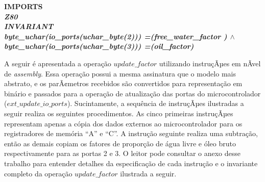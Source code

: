 \documentclass[11pt]{article} %
\begin{document}
\small{
\begin{sloppypar}
\hspace*{-0.30in}\bf IMPORTS\\
\hspace*{0.20in}\it Z80\\
\bf INVARIANT\\
\hspace*{0.20in}\it byte\_uchar\rm (\it io\_ports\rm (\it uchar\_byte\rm (\rm 2\rm )\rm )\rm ) \rm
=\hspace*{0.10in}\rm (\it free\_water\_factor \rm )  $\land$\\
\hspace*{0.20in}\it byte\_uchar\rm (\it io\_ports\rm (\it uchar\_byte\rm (\rm 3\rm )\rm )\rm ) \rm
=\hspace*{0.10in}\rm (\it oil\_factor\rm )
\end{sloppypar}
}

A seguir é apresentada a operação $\mathit{update\_factor}$ utilizando instruçÃµes em nÃ­vel de
\textit{assembly}. Essa operação possui a mesma assinatura que o modelo mais abstrato, e os parÃ¢metros
recebidos são convertidos para representação em binário e passados para a operação de atualização das
portas do microcontrolador ($\mathit{ext\_update\_io\_ports}$).
Sucintamente, a sequência de instruçÃµes ilustradas a seguir realiza os seguintes procedimentos. As cinco
primeiras instruçÃµes representam apenas a cópia dos dados externos ao microcontrolador para os
registradores de memória ``A'' e ``C''. A instrução seguinte realiza uma subtração, então as demais copiam
os fatores de proporção de água livre e óleo bruto respectivamente para as portas 2 e 3. O leitor pode
consultar o anexo desse trabalho para entender detalhes da especificação de cada instrução e o invariante
completo da operação $\mathit{update\_factor}$ ilustrada a seguir.


   
\newpage
\end{document}
